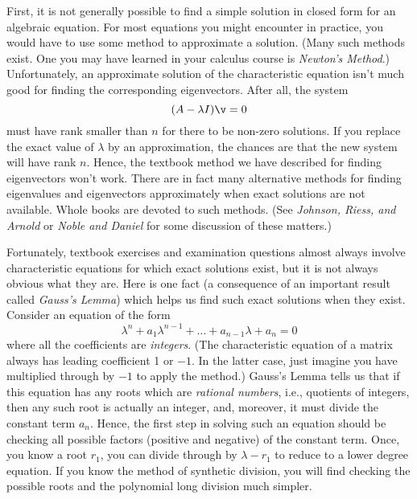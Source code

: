 First, it is not generally possible to find a simple solution
in closed form for an algebraic equation.   For most equations
you might encounter in practice, you would have to use
some method to approximate a solution.  (Many such methods exist.
One you may have learned in your calculus course is
{\it Newton's Method\/}.)   Unfortunately, an approximate
solution of the characteristic equation isn't much good for
finding the corresponding eigenvectors.  After all, the
system
$$ (A - \lambda I)\v = 0 $$
must have rank smaller than $n$ for there to be non-zero solutions.
If you replace the exact value of $\lambda$  by an approximation,
the chances are that the new system will have rank $n$.  Hence,
the textbook method we have described for finding eigenvectors
won't work.  There are in fact many alternative methods for
finding eigenvalues and eigenvectors approximately when exact
solutions are not available.   Whole books are devoted to
such methods.  (See {\it Johnson, Riess, and Arnold\/} or
{\it Noble and Daniel\/} for some discussion of these matters.)  

Fortunately, textbook  exercises and examination questions
 almost always involve characteristic equations for
which exact solutions exist, but it is not always obvious what
they are.   Here is one  fact (a consequence of an
important result called {\it Gauss's Lemma\/}) which helps us
find such exact solutions when they exist.  Consider an
equation of the form
$$
\lambda^n + a_1\lambda^{n-1} + \dots + a_{n-1}\lambda + a_n = 0
$$
where all the coefficients are {\it integers}.   (The
characteristic equation of a matrix always has leading coefficient
1 or $-1$.  In the latter case, just imagine you have
multiplied through by $-1$
to apply the method.)   Gauss's Lemma tells us that if this
equation has any roots which are {\it rational numbers\/},
i.e., quotients of integers, then any such root is actually
an integer, and, moreover, it must divide the constant term
$a_n$.  Hence, the first step in solving such an equation should
be checking all possible factors (positive and negative)
of the constant term.  Once, you know a root $r_1$, you can divide through
by $\lambda - r_1$ to reduce to a lower degree equation.
If you know the method of synthetic division, you will find
checking the possible roots and the polynomial long division 
much simpler.

